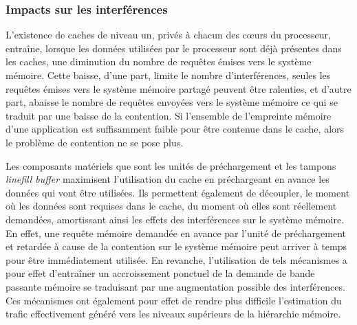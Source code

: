         \subsubsection{Impacts sur les interférences}
        \label{l1:impacts_sur_nos_travaux}

        L'existence de caches de niveau un, privés à chacun des cœurs du processeur, entraîne, lorsque les données utilisées par le processeur sont déjà présentes dans les caches, une diminution du nombre de requêtes émises vers le système mémoire.
        Cette baisse, d’une part, limite le nombre d'interférences, seules les requêtes émises vers le système mémoire partagé peuvent être ralenties, et d'autre part, abaisse le nombre de requêtes envoyées vers le système mémoire ce qui se traduit par une baisse de la contention.
        Si l'ensemble de l'empreinte mémoire d'une application est suffisamment faible pour être contenue dans le cache, alors le problème de contention ne se pose plus.


        Les composants matériels que sont les unités de préchargement et les tampons \emph{linefill buffer} maximisent l'utilisation du cache en préchargeant en avance les données qui vont être utilisées.
        Ils permettent également de découpler, le moment où les données sont requises dans le cache, du moment où elles sont réellement demandées, amortissant ainsi les effets des interférences sur le système mémoire.
        En effet, une requête mémoire demandée en avance par l'unité de préchargement et retardée à cause de la contention sur le système mémoire peut arriver à temps pour être immédiatement utilisée.
        En revanche, l'utilisation de tels mécanismes a pour effet d'entraîner un accroissement ponctuel de la demande de bande passante mémoire se traduisant par une augmentation possible des interférences.
        Ces mécanismes ont également pour effet de rendre plus difficile l'estimation du trafic effectivement généré vers les niveaux supérieurs de la hiérarchie mémoire.




